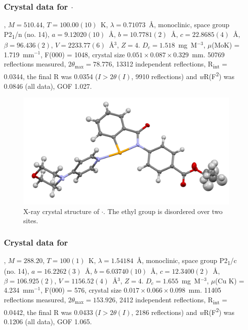 \begin{refsection}
\subsubsection{Crystal data for \texorpdfstring{$\cdot$}{C25 H25 N3 O4 Se}}
, $M=510.44$, $T=100.00(10)$~K, $\lambda=0.71073$~\AA, monoclinic, space group P2\textsubscript{1}/n (no. 14), $a = 9.12020(10)$~\AA, $b = 10.7781(2)$~\AA, $c = 22.8685(4)$~\AA, $\beta = 96.436(2)$\degree, $V = 2233.77(6)$~\AA$^{3}$, $Z = 4$. $D_{c}= 1.518$~mg~M$^{-3}$, $\mu$(MoK\a) = 1.719~mm$^{-1}$, F(000) = 1048, crystal size $0.051 \times 0.087 \times 0.329$~mm. 50769 reflections measured, $2\theta_{\mathrm{max}}=78.776$\degree, 13312 independent reflections, R\textsubscript{int} = 0.0344, the final R was 0.0354 ($I > 2\theta(I)$, 9910 reflections) and \emph{w}R(F\textsuperscript{2}) was 0.0846 (all data), GOF 1.027.

\begin{figure}
  \includegraphics[width=0.6\linewidth]{Figures/ebs-4co2et-morph-xtal.pdf}
  \caption[X-ray crystal structure of \texorpdfstring{$\cdot$}{C25 H25 N3 O4 Se}.]{X-ray crystal structure of \texorpdfstring{$\cdot$}{C25 H25 N3 O4 Se}. The ethyl group is disordered over two sites.}
\end{figure}

\subsubsection{Crystal data for \texorpdfstring{}{C14 H11 N O Se}}
, $M=288.20$, $T=100(1)$~K, $\lambda=1.54184$~\AA, monoclinic, space group P2\textsubscript{1}/c (no. 14), $a = 16.2262(3)$~\AA, $b = 6.03740(10)$~\AA, $c = 12.3400(2)$~\AA, $\beta = 106.925(2)$\degree, $V = 1156.52(4)$~\AA$^{3}$, $Z = 4$. $D_{c}= 1.655$~mg~M$^{-3}$, $\mu$(Cu K\a) = 4.234~mm$^{-1}$, F(000) = 576, crystal size $0.017 \times 0.066 \times 0.098$~mm. 11405 reflections measured, $2\theta_{\mathrm{max}}=153.926$\degree, 2412 independent reflections, R\textsubscript{int} = 0.0442, the final R was 0.0433 ($I > 2\theta(I)$, 2186 reflections) and \emph{w}R(F\textsuperscript{2}) was 0.1206 (all data), GOF 1.065.


\end{refsection}
